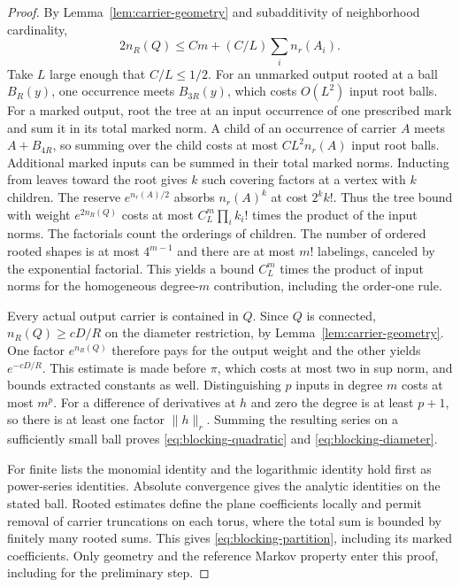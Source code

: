 \documentclass[11pt]{article}
\theoremstyle{definition}
\begin{document}
\begin{proof}
By Lemma~\ref{lem:carrier-geometry} and subadditivity of
neighborhood cardinality,
\[
 2n_R(Q)\le Cm+(C/L)\sum_i n_r(A_i).
\]
Take \(L\) large enough that \(C/L\le1/2\).
For an unmarked output rooted at a ball \(B_R(y)\), one
occurrence meets \(B_{3R}(y)\), which costs \(O(L^2)\) input
root balls. For a marked output, root the tree at an input
occurrence of one prescribed mark and sum it in its total
marked norm. A child of an occurrence of carrier \(A\) meets
\(A+B_{4R}\), so summing over the child costs at most
\(CL^2n_r(A)\) input root balls. Additional marked inputs
can be summed in their total marked norms. Inducting from
leaves toward the root gives \(k\) such covering factors at
a vertex with \(k\) children. The reserve
\(e^{n_r(A)/2}\) absorbs \(n_r(A)^k\) at cost \(2^k k!\).
Thus the tree bound with weight \(e^{2n_R(Q)}\) costs at most
\(C_L^m\prod_i k_i!\) times the product of the input norms.
The factorials count the orderings of children. The number of
ordered rooted shapes is at most \(4^{m-1}\) and there are at
most \(m!\) labelings, canceled by the exponential factorial.
This yields a bound \(C_L^m\) times the product of input norms
for the homogeneous degree-\(m\) contribution, including
the order-one rule.

Every actual output carrier is contained in \(Q\). Since \(Q\)
is connected, \(n_R(Q)\ge cD/R\) on the diameter restriction,
by Lemma~\ref{lem:carrier-geometry}. One factor \(e^{n_R(Q)}\)
therefore pays for the output weight and the other yields
\(e^{-cD/R}\). This estimate is made before \(\pi\), which costs
at most two in sup norm, and bounds extracted constants as well.
Distinguishing \(p\) inputs in degree \(m\) costs at most \(m^p\).
For a difference of derivatives at \(h\) and zero the degree
is at least \(p+1\), so there is at least one factor \(\|h\|_r\).
Summing the resulting series on a sufficiently small ball
proves \eqref{eq:blocking-quadratic} and \eqref{eq:blocking-diameter}.

For finite lists the monomial identity and the logarithmic
identity hold first as power-series identities. Absolute
convergence gives the analytic identities on the stated
ball. Rooted estimates define the plane coefficients locally
and permit removal of carrier truncations on each torus, where
the total sum is bounded by finitely many rooted sums. This
gives \eqref{eq:blocking-partition}, including its marked
coefficients. Only geometry and the reference Markov property
enter this proof, including for the preliminary step.
\end{proof}
\end{document}
